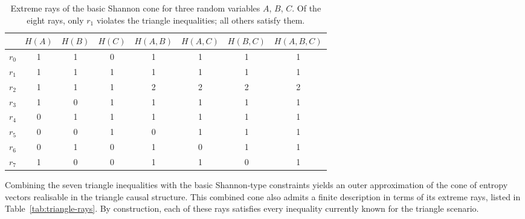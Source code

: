 \documentclass[reprint,pra, twocolumn, amsmath,amssymb,
 aps,superscriptaddress,]{revtex4-2}
\begin{document}
\begin{table}[h]
    \centering
    \begin{tabular}{c|ccccccc}
        & $H(A)$ & $H(B)$ & $H(C)$ & $H(A,B)$ & $H(A,C)$ & $H(B,C)$ & $H(A,B,C)$ \\
        \hline
        $r_0$ & 1 & 1 & 0 & 1 & 1 & 1 & 1 \\
        $r_1$ & 1 & 1 & 1 & 1 & 1 & 1 & 1 \\
        $r_2$ & 1 & 1 & 1 & 2 & 2 & 2 & 2 \\
        $r_3$ & 1 & 0 & 1 & 1 & 1 & 1 & 1 \\
        $r_4$ & 0 & 1 & 1 & 1 & 1 & 1 & 1 \\
        $r_5$ & 0 & 0 & 1 & 0 & 1 & 1 & 1 \\
        $r_6$ & 0 & 1 & 0 & 1 & 0 & 1 & 1 \\
        $r_7$ & 1 & 0 & 0 & 1 & 1 & 0 & 1 \\
    \end{tabular}
    \caption{Extreme rays of the basic Shannon cone for three random variables $A$, $B$, $C$. Of the eight rays, only $r_1$ violates the triangle inequalities; all others satisfy them.}
    \label{tab:shannon-rays}
\end{table}

Combining the seven triangle inequalities with the basic Shannon-type constraints yields an outer approximation of the cone of entropy vectors realisable in the triangle causal structure.
This combined cone also admits a finite description in terms of its extreme rays, listed in Table~\ref{tab:triangle-rays}.
By construction, each of these rays satisfies every inequality currently known for the triangle scenario.
\end{document}
